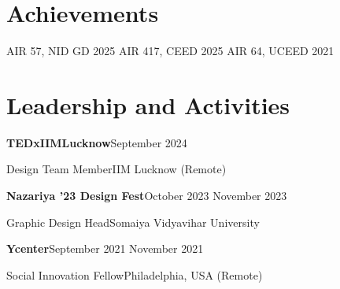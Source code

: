 \documentclass[a4paper,10pt]{article}
\newlength{\entrygap}\setlength{\entrygap}{9pt}
\newcommand{\sep}{\unskip\enspace{\color{rule}\textbar}\enspace\ignorespaces}
\newcommand{\entry}[4]{%
    {\color{ink}\textbf{#1}}\hfill{\color{muted}#2}\par
    {\color{navy}#3}\hfill{\color{muted}#4}\par
}
\begin{document}
\section{Achievements}

AIR 57, NID GD 2025 \sep AIR 417, CEED 2025 \sep AIR 64, UCEED 2021\par

\section{Leadership and Activities}

\entry{TEDxIIMLucknow}{September 2024}{Design Team Member}{IIM Lucknow (Remote)}
\vspace{\entrygap}

\entry{Nazariya '23 Design Fest}{October 2023 \textendash{} November 2023}{Graphic Design Head}{Somaiya Vidyavihar University}
\vspace{\entrygap}

\entry{Ycenter}{September 2021 \textendash{} November 2021}{Social Innovation Fellow}{Philadelphia, USA (Remote)}
\end{document}
